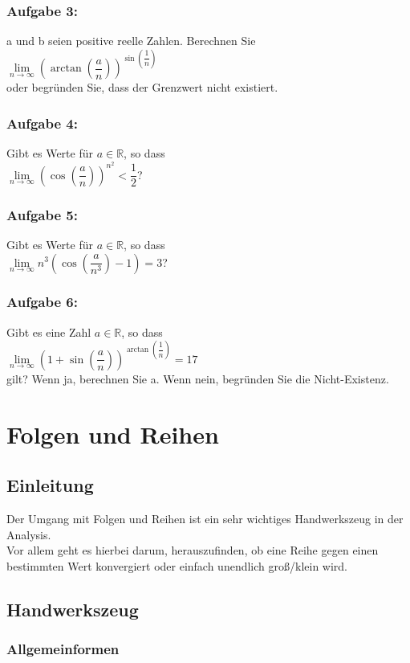 \documentclass[11pt,final]{scrreprt}
\newcommand{\br} {\medskip\\}
\newcommand{\R} {\mathbb R}
\begin{document}
\subsection*{Aufgabe 3: }
a und b seien positive reelle Zahlen. Berechnen Sie \br
\hspace*{2em}$ \lim\limits_{n\to\infty} (\arctan(\dfrac{a}{n}))^{{\sin(\dfrac{1}{n})}}$\br
oder begründen Sie, dass der Grenzwert nicht existiert.
\subsection*{Aufgabe 4: }
Gibt es Werte für $ a\in\R$, so dass \br
\hspace*{2em}$ \lim\limits_{n\to\infty} (\cos(\dfrac{a}{n}))^{n^2} < \dfrac{1}{2}$?
\subsection*{Aufgabe 5: }
Gibt es Werte für $ a\in\R$, so dass \br
\hspace*{2em}$ \lim\limits_{n\to\infty} n^3(\cos(\dfrac{a}{n^3})-1) = 3$?
\subsection*{Aufgabe 6: }
Gibt es eine Zahl $ a\in\R$, so dass \br
\hspace*{2em}$ \lim\limits_{n\to\infty} (1+\sin(\dfrac{a}{n}))^{{\arctan(\dfrac{1}{n})}} = 17$\br
gilt? Wenn ja, berechnen Sie a. Wenn nein, begründen Sie die Nicht-Existenz.\\

\chapter{Folgen und Reihen}

\section{Einleitung}
Der Umgang mit Folgen und Reihen ist ein sehr wichtiges Handwerkszeug in der Analysis.\\
Vor allem geht es hierbei darum, herauszufinden, ob eine Reihe gegen einen bestimmten Wert konvergiert oder einfach unendlich groß/klein wird.\br

\section{Handwerkszeug}

\subsection*{Allgemeinformen}
\end{document}
